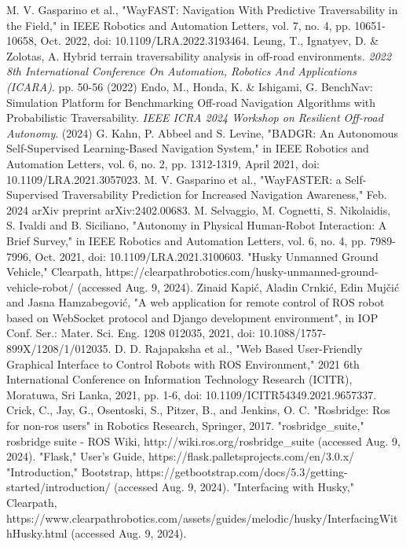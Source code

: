 \documentclass[letterpaper, 10 pt, conference]{ieeeconf}  %
\begin{document}




\begin{thebibliography}{99}

 M. V. Gasparino et al., "WayFAST: Navigation With Predictive Traversability in the Field," in IEEE Robotics and Automation Letters, vol. 7, no. 4, pp. 10651-10658, Oct. 2022, doi: 10.1109/LRA.2022.3193464.
Leung, T., Ignatyev, D. \& Zolotas, A. Hybrid terrain traversability analysis in off-road environments. {\em 2022 8th International Conference On Automation, Robotics And Applications (ICARA)}. pp. 50-56 (2022)
Endo, M., Honda, K. \& Ishigami, G. BenchNav: Simulation Platform for Benchmarking Off-road Navigation Algorithms with Probabilistic Traversability. {\em IEEE ICRA 2024 Workshop on Resilient Off-road Autonomy}. (2024)
 G. Kahn, P. Abbeel and S. Levine, "BADGR: An Autonomous Self-Supervised Learning-Based Navigation System," in IEEE Robotics and Automation Letters, vol. 6, no. 2, pp. 1312-1319, April 2021, doi: 10.1109/LRA.2021.3057023.
 M. V. Gasparino et al., "WayFASTER: a Self-Supervised Traversability Prediction for Increased Navigation Awareness," Feb. 2024 arXiv preprint arXiv:2402.00683.
 M. Selvaggio, M. Cognetti, S. Nikolaidis, S. Ivaldi and B. Siciliano, "Autonomy in Physical Human-Robot Interaction: A Brief Survey," in IEEE Robotics and Automation Letters, vol. 6, no. 4, pp. 7989-7996, Oct. 2021, doi: 10.1109/LRA.2021.3100603.
"Husky Unmanned Ground Vehicle," Clearpath, https://clearpathrobotics.com/husky-unmanned-ground-vehicle-robot/ (accessed Aug. 9, 2024).
 Zinaid Kapić, Aladin Crnkić, Edin Mujčić and Jasna Hamzabegović, "A web application for remote control of ROS robot based on WebSocket protocol and Django development environment", in IOP Conf. Ser.: Mater. Sci. Eng. 1208 012035, 2021, doi: 10.1088/1757-899X/1208/1/012035.
 D. D. Rajapaksha et al., "Web Based User-Friendly Graphical Interface to Control Robots with ROS Environment," 2021 6th International Conference on Information Technology Research (ICITR), Moratuwa, Sri Lanka, 2021, pp. 1-6, doi: 10.1109/ICITR54349.2021.9657337.
 Crick, C., Jay, G., Osentoski, S., Pitzer, B., and Jenkins, O. C. "Rosbridge: Ros for non-ros users" in Robotics Research, Springer, 2017.
"rosbridge\_suite," rosbridge suite - ROS Wiki, http://wiki.ros.org/rosbridge\_suite (accessed Aug. 9, 2024).
"Flask," User’s Guide, https://flask.palletsprojects.com/en/3.0.x/
"Introduction," Bootstrap, https://getbootstrap.com/docs/5.3/getting-started/introduction/ (accessed Aug. 9, 2024).
"Interfacing with Husky," Clearpath, https://www.clearpathrobotics.com/assets/guides/melodic/husky/InterfacingWithHusky.html (accessed Aug. 9, 2024).






\end{thebibliography}
\end{document}
